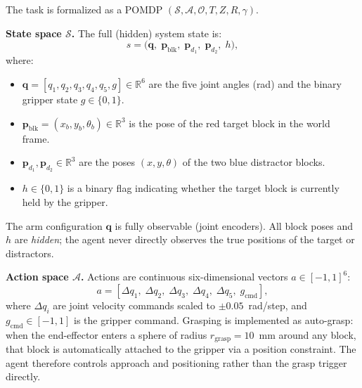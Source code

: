 \documentclass[conference]{IEEEtran}
\newcommand{\States}{\mathcal{S}}
\newcommand{\Actions}{\mathcal{A}}
\newcommand{\Obs}{\mathcal{O}}
\newcommand{\Trans}{T}
\newcommand{\Rew}{R}
\newcommand{\ObsFn}{Z}
\newcommand{\Disc}{\gamma}
\newcommand{\block}{\mathbf{p}_{\text{blk}}}
\begin{document}
The task is formalized as a POMDP
$(\States, \Actions, \Obs, \Trans, \ObsFn, \Rew, \Disc)$.

\textbf{State space $\States$.}
The full (hidden) system state is:
\begin{equation}
  s = \bigl(\mathbf{q},\; \block,\; \mathbf{p}_{d_1},\; \mathbf{p}_{d_2},\; h\bigr),
\end{equation}
where:
\begin{itemize}
  \item $\mathbf{q} = [q_1, q_2, q_3, q_4, q_5, g] \in \mathbb{R}^6$ are the
        five joint angles (rad) and the binary gripper state $g \in \{0,1\}$.
  \item $\block = (x_b, y_b, \theta_b) \in \mathbb{R}^3$ is the pose of the
        red target block in the world frame.
  \item $\mathbf{p}_{d_1}, \mathbf{p}_{d_2} \in \mathbb{R}^3$ are the poses
        $(x, y, \theta)$ of the two blue distractor blocks.
  \item $h \in \{0, 1\}$ is a binary flag indicating whether the target block
        is currently held by the gripper.
\end{itemize}
The arm configuration $\mathbf{q}$ is fully observable (joint encoders).
All block poses and $h$ are \emph{hidden}; the agent never directly observes
the true positions of the target or distractors.

\textbf{Action space $\Actions$.}
Actions are continuous six-dimensional vectors $a \in [-1, 1]^6$:
\begin{equation}
  a = [\Delta q_1,\; \Delta q_2,\; \Delta q_3,\; \Delta q_4,\; \Delta q_5,\; g_{\text{cmd}}],
\end{equation}
where $\Delta q_i$ are joint velocity commands scaled to $\pm 0.05$~rad/step,
and $g_{\text{cmd}} \in [-1, 1]$ is the gripper command.
Grasping is implemented as auto-grasp: when the end-effector enters a sphere
of radius $r_{\text{grasp}} = 10$~mm around any block, that block is
automatically attached to the gripper via a position constraint.
The agent therefore controls approach and positioning rather than the
grasp trigger directly.
\end{document}
